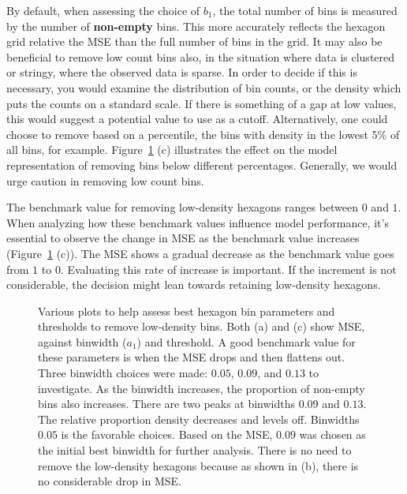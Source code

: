 \documentclass[
  12pt]{article}
\begin{document}
By default, when assessing the choice of \(b_1\), the total number of
bins is measured by the number of \textbf{non-empty} bins. This more
accurately reflects the hexagon grid relative the MSE than the full
number of bins in the grid. It may also be beneficial to remove low
count bins also, in the situation where data is clustered or stringy,
where the observed data is sparse. In order to decide if this is
necessary, you would examine the distribution of bin counts, or the
density which puts the counts on a standard scale. If there is something
of a gap at low values, this would suggest a potential value to use as a
cutoff. Alternatively, one could choose to remove based on a percentile,
the bins with density in the lowest 5\% of all bins, for example.
Figure~\ref{fig-param-two-curvy} (c) illustrates the effect on the model
representation of removing bins below different percentages. Generally,
we would urge caution in removing low count bins.

The benchmark value for removing low-density hexagons ranges between
\(0\) and \(1\). When analyzing how these benchmark values influence
model performance, it's essential to observe the change in MSE as the
benchmark value increases (Figure~\ref{fig-param-two-curvy} (c)). The
MSE shows a gradual decrease as the benchmark value goes from \(1\) to
\(0\). Evaluating this rate of increase is important. If the increment
is not considerable, the decision might lean towards retaining
low-density hexagons.

\begin{figure}[H]


\caption{\label{fig-param-two-curvy}Various plots to help assess best
hexagon bin parameters and thresholds to remove low-density bins. Both
(a) and (c) show MSE, against binwidth (\(a_1\)) and threshold. A good
benchmark value for these parameters is when the MSE drops and then
flattens out. Three binwidth choices were made: \(0.05\), \(0.09\), and
\(0.13\) to investigate. As the binwidth increases, the proportion of
non-empty bins also increases. There are two peaks at binwidths \(0.09\)
and \(0.13\). The relative proportion density decreases and levels off.
Binwidths \(0.05\) is the favorable choices. Based on the MSE, \(0.09\)
was chosen as the initial best binwidth for further analysis. There is
no need to remove the low-density hexagons because as shown in (b),
there is no considerable drop in MSE.}

\end{figure}%
\end{document}
